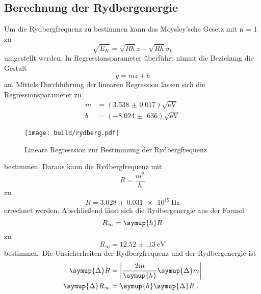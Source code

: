 \subsection{Berechnung der Rydbergenergie}
Um die Rydbergfrequenz zu bestimmen kann das Moysley'sche Gesetz mit n = 1 zu 
\begin{equation}
    \sqrt{E_K} = \sqrt{Rh}z - \sqrt{Rh}\sigma_k
\end{equation}
umgestellt werden.
In Regressionsparameter überführt nimmt die Beziehung die Gestalt
\begin{equation}
    y = mz+b
\end{equation}
an.
Mittels Durchführung der linearen Regression lassen sich die Regressionsparameter zu 
\begin{align*}
        m & = \left( \num{3.538(17)} \right)   \sqrt{\si{\electronvolt}} \\
        b & = \left( \num{-8.024(636)} \right) \sqrt{\si{\electronvolt}}
\end{align*}
\begin{figure}
    \centering
    \caption{Lineare Regresssion zur Bestimmung der Rydbergfrequenz}
    \label{fig:rydberg}
    \texttt{[image: build/rydberg.pdf]}
\end{figure}
bestimmen.
Daraus kann die Rydbergfrequenz mit
\begin{equation*}
    R = \frac{m^2}{h}
\end{equation*}
zu 
\begin{equation*}
    R = \SI{3.028(31)e15}{\hertz}
\end{equation*}
errechnet werden.
Abschließend lässt sich die Rydbergenergie aus der Formel
\begin{equation}
    R_\infty = \symup{h}R
\end{equation}
zu
\begin{equation*}
    R_\infty = \SI{12.52(13)}{\electronvolt}
\end{equation*}
bestimmen.
Die Unsicherheiten der Rydbergfrequenz und der Rydbergenergie ist
\begin{align}
    \symup{\Delta} R        & = \left | \frac{2m}{\symup{h}} \symup{\Delta}m \right | \\
    \symup{\Delta} R_\infty & = \symup{h} \symup{\Delta} R \; \text{.}
\end{align}